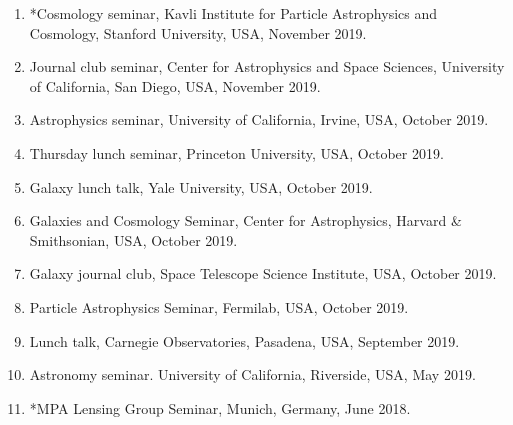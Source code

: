 \documentclass[margin, line]{res}
\begin{document}
\begin{resume}
\begin{enumerate}
	\item *Cosmology seminar, Kavli Institute for Particle Astrophysics and Cosmology, Stanford University, USA, November 2019.
	\item Journal club seminar, Center for Astrophysics and Space Sciences, University of California, San Diego, USA, November 2019.
	\item Astrophysics seminar, University of California, Irvine, USA, October 2019.
	\item Thursday lunch seminar, Princeton University, USA, October 2019.
	\item Galaxy lunch talk, Yale University, USA, October 2019.
	\item Galaxies and Cosmology Seminar, Center for Astrophysics, Harvard \& Smithsonian, USA, October 2019.
	\item Galaxy journal club, Space Telescope Science Institute, USA, October 2019.
	\item Particle Astrophysics Seminar, Fermilab, USA, October 2019.
	\item Lunch talk, Carnegie Observatories, Pasadena, USA, September 2019.
	\item Astronomy seminar. University of California, Riverside, USA, May 2019. 
	\item {*}MPA Lensing Group Seminar, Munich, Germany, June 2018.
\end{enumerate}



\end{resume}
\end{document}
